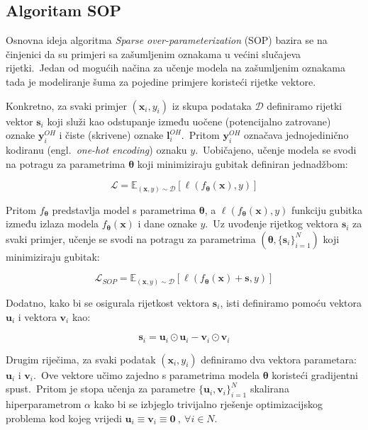 \documentclass[diplomskirad]{fer}
\begin{document}
\subsection{Algoritam SOP}
\label{sub:sop}

Osnovna ideja algoritma \textit{Sparse over-parameterization} (SOP) bazira se na činjenici da su primjeri sa zašumljenim oznakama u većini slučajeva rijetki.\ 
Jedan od mogućih načina za učenje modela na zašumljenim oznakama tada je modeliranje šuma za pojedine primjere koristeći rijetke vektore.\ 

Konkretno, za svaki primjer $(\bm{x}_i, y_i)$ iz skupa podataka $\mathcal{D}$ definiramo rijetki vektor $\bm{s}_i$ koji služi kao odstupanje između uočene (potencijalno zatrovane) oznake $\bm{y}_i^{OH}$ i čiste (skrivene) oznake $\bm{l}_i^{OH}$.\ 
Pritom $\bm{y}_i^{OH}$ označava jednojedinično kodiranu (engl.\ \textit{one-hot encoding}) oznaku $y$.\ Uobičajeno, učenje modela se svodi na potragu za parametrima $\bm{\theta}$ koji minimiziraju gubitak definiran jednadžbom:

\begin{equation}
  \mathcal{L} = \mathbb{E}_{(\bm{x}, y) \sim \mathcal{D}} \left[ \ell(f_{\bm{\theta}}(\bm{x}), y) \right]
  \label{eq:sop1}
\end{equation}

Pritom $f_{\bm{\theta}}$ predstavlja model s parametrima $\bm{\theta}$, a $\ell(f_{\bm{\theta}}(\bm{x}), y)$ funkciju gubitka između izlaza modela $f_{\bm{\theta}}(\bm{x})$ i dane oznake $y$.\ 
Uz uvođenje rijetkog vektora $\bm{s}_i$ za svaki primjer, učenje se svodi na potragu za parametrima $(\bm{\theta}, \{\bm{s}_i\}_{i=1}^N)$ koji minimiziraju gubitak:

\begin{equation}
  \mathcal{L}_{SOP} = \mathbb{E}_{(\bm{x}, y) \sim \mathcal{D}} \left[ \ell(f_{\bm{\theta}}(\bm{x}) + \bm{s}, y) \right]
  \label{eq:sop2}
\end{equation}

Dodatno, kako bi se osigurala rijetkost vektora $\bm{s}_i$, isti definiramo pomoću vektora $\bm{u}_i$ i vektora $\bm{v}_i$ kao:

\begin{equation}
  \bm{s}_i = \bm{u}_i \odot \bm{u}_i - \bm{v}_i \odot \bm{v}_i
  \label{eq:sop_s1}
\end{equation}

Drugim riječima, za svaki podatak $(\bm{x}_i, y_i)$ definiramo dva vektora parametara: $\bm{u}_i$ i $\bm{v}_i$.\ 
Ove vektore učimo zajedno s parametrima modela $\bm{\theta}$ koristeći gradijentni spust.\ 
Pritom je stopa učenja za parametre $\{\bm{u}_i,\bm{v}_i\}_{i=1}^N$ skalirana hiperparametrom $\alpha$ kako bi se izbjeglo trivijalno rješenje optimizacijskog problema kod kojeg vrijedi $\bm{u}_i \equiv \bm{v}_i \equiv \bm{0}\:,\:\forall i \in N$.\ 
\end{document}
